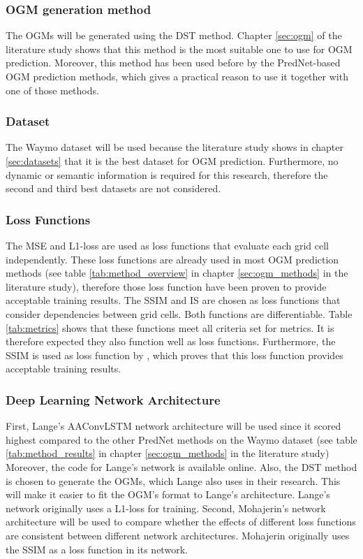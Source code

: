 \subsubsection{\gls{OGM} generation method} 
The \glspl{OGM} will be generated using the \gls{DST} method. Chapter \ref{sec:ogm} of the literature study shows that this method is the most suitable one to use for \gls{OGM} prediction. Moreover, this method has been used before by the PredNet-based \gls{OGM} prediction methods, which gives a practical reason to use it together with one of those methods.  

\subsubsection{Dataset} 
The Waymo \cite{sun2020scalability} dataset will be used because the literature study shows in chapter \ref{sec:datasets} that it is the best dataset for \gls{OGM} prediction. Furthermore, no dynamic or semantic information is required for this research, therefore the second and third best datasets are not considered. 

\subsubsection{Loss Functions}
The \gls{MSE} and L1-loss are used as loss functions that evaluate each grid cell independently. These loss functions are already used in most \gls{OGM} prediction methods (see table \ref{tab:method_overview} in chapter \ref{sec:ogm_methods} in the literature study), therefore those loss function have been proven to provide acceptable training results. The \gls{SSIM} and \gls{IS} are chosen as loss functions that consider dependencies between grid cells. Both functions are differentiable. Table \ref{tab:metrics} shows that these functions meet all criteria set for metrics. It is therefore expected they also function well as loss functions. Furthermore, the \gls{SSIM} is used as loss function by \cite{mohajerin2019multi}, which proves that this loss function provides acceptable training results.

\subsubsection{Deep Learning Network Architecture} 
First, Lange's \cite{lange2020attention} \gls{AAConvLSTM} network architecture will be used since it scored highest compared to the other PredNet methods on the Waymo \cite{sun2020scalability} dataset (see table \ref{tab:method_results} in chapter \ref{sec:ogm_methods} in the literature study) Moreover, the code for Lange's \cite{lange2020attention} network is available online. Also, the \gls{DST} method is chosen to generate the \glspl{OGM}, which Lange also uses in their research. This will make it easier to fit the \gls{OGM}'s format to Lange's architecture. Lange's network originally uses a L1-loss for training. 
Second, Mohajerin's \cite{mohajerin2019multi} network architecture will be used to compare whether the effects of different loss functions are consistent between different network architectures. Mohajerin \cite{mohajerin2019multi} originally uses the \gls{SSIM} as a loss function in its network.

